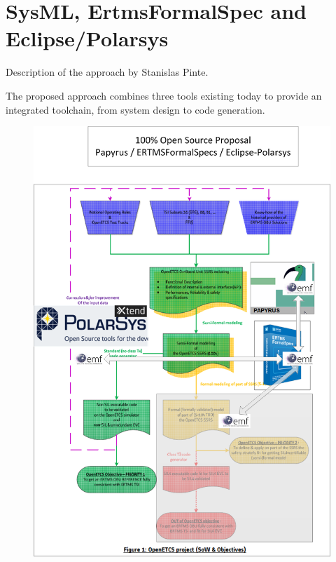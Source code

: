 \chapter{SysML, ErtmsFormalSpec and Eclipse/Polarsys}
\label{sec:sysML-EFS}

\begin{todo_comment}
Description of the approach by Stanislas Pinte.
\end{todo_comment}

The proposed approach combines three tools existing today to provide an integrated toolchain, from system design 
to code generation.

\begin{figure}
	\centering
		\includegraphics{images/ERTMSSolutionsAlt_1.png}
	\label{fig:ERTMSSolutionsAlt_1}
\end{figure}

